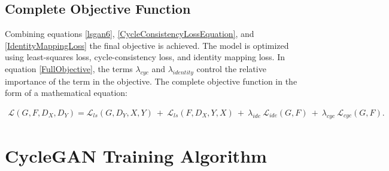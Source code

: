 \subsection{Complete Objective Function}

Combining equations \ref{lsgan6}, \ref{CycleConsistencyLossEquation}, and \ref{IdentityMappingLoss} the final objective is achieved. The model is optimized using least-squares loss, cycle-consistency loss, and identity mapping loss. In equation \ref{FullObjective}, the terms $\lambda_{cyc}$ and $\lambda_{identity}$ control the relative importance of the term in the objective. The complete objective function in the form of a mathematical equation:

\begin{equation}\label{FullObjective}
\begin{aligned}
    \mathcal{L}(G, F, D_X, D_Y) =  \mathcal{L}_{ls}(G, D_Y, X, Y)\ +\ \mathcal{L}_{ls}(F, D_X, Y, X)\ +\ 
    \lambda_{ide}\ \mathcal{L}_{ide}(G, F)\ +\ \lambda_{cyc}\ \mathcal{L}_{cyc}(G, F).
\end{aligned}
\end{equation}
    

\section{\ac{CycleGAN} Training Algorithm}\label{CycleGANAlgorithm}



